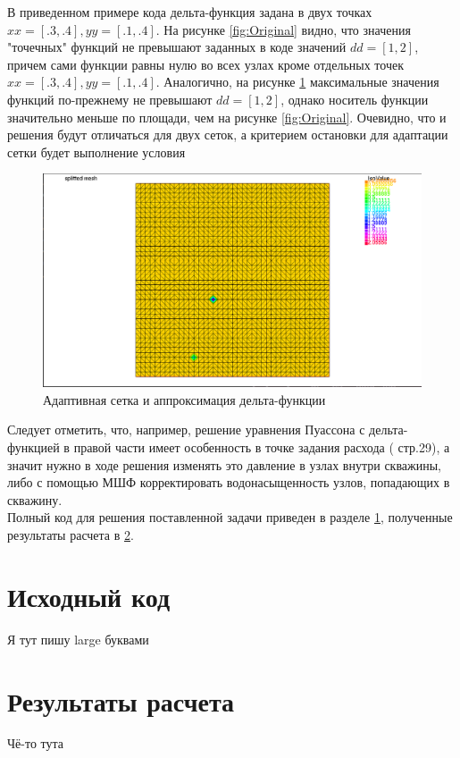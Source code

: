 В приведенном примере кода дельта-функция задана в двух точках $xx = [.3, .4], yy = [.1, .4]$.
На рисунке \ref{fig:Original} видно, что значения "точечных" функций не превышают
заданных в коде значений $dd = [1, 2]$, причем сами функции равны нулю во всех узлах кроме
отдельных точек $xx = [.3, .4], yy = [.1, .4]$.
Аналогично, на рисунке \ref{fig:Split} максимальные значения функций по-прежнему не превышают
$dd = [1, 2]$, однако носитель функции значительно меньше по площади, чем на рисунке \ref{fig:Original}.
Очевидно, что и решения будут отличаться для двух сеток, а критерием остановки для адаптации сетки будет 
выполнение условия  
\begin{figure}[H]
	\centering
	\includegraphics[width=0.7\linewidth]{img/splitMesh.png}
	\caption{Адаптивная сетка и аппроксимация дельта-функции}
	\label{fig:Split}
\end{figure}
Следует отметить, что, например, решение уравнения Пуассона с дельта-функцией в правой части имеет 
особенность в точке задания расхода (\cite{Hunt} стр.29), а значит нужно в ходе решения изменять это 
давление в узлах внутри скважины, либо с помощью МШФ корректировать водонасыщенность узлов, попадающих 
в скважину.\\
Полный код для решения поставленной задачи приведен в разделе \ref{appendix:App1}, полученные результаты расчета в 
\ref{appendix:App2}.

\newpage
\begin{appendices}
	\section{Исходный код}\label{appendix:App1}
	Я тут пишу {\Huge large} буквами
	\newpage
	\section{Результаты расчета}\label{appendix:App2}
		Чё-то тута
	\end{appendices}

\newpage



